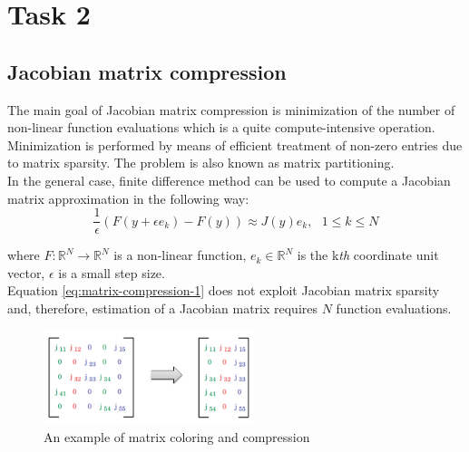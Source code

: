 \chapter{Task 2}\label{chapter:introduction}

\section{Jacobian matrix compression}
\label{sec:jacobian-matrix-compression}


The main goal of Jacobian matrix compression is minimization of the number of non-linear function evaluations which is a quite compute-intensive operation. Minimization is performed by means of efficient treatment of non-zero entries due to matrix sparsity. The problem is also known as matrix partitioning.\\


In the general case, finite difference method can be used to compute a Jacobian matrix approximation in the following way:\\

\begin{equation} \label{eq:matrix-compression-1}
	\frac{1}{\epsilon} (F(y + \epsilon e_{k}) - F(y)) \approx J(y) e_{k}, \: \: \: 1 \leq k \leq N
\end{equation}

where $F : \mathbb{R}^{N} \rightarrow \mathbb{R}^{N}$  is a non-linear function, $e_{k} \in \mathbb{R}^{N}$ is the k\textit{th} coordinate unit vector, $\epsilon$ is a small step size.\\


Equation \ref{eq:matrix-compression-1} does not exploit Jacobian matrix sparsity and, therefore, estimation of a Jacobian matrix requires $N$  function evaluations.\\


\figpointer{\ref{fig:example-of-matrix-compression}}
\begin{figure}[htpb]
  \centering
  \includegraphics[width=0.55\textwidth]{figures/chapter-3/matrix-compression-example.png}
\caption{An example of matrix coloring and compression \cite{gebremedhin2005color}}
\label{fig:example-of-matrix-compression}
\end{figure}


